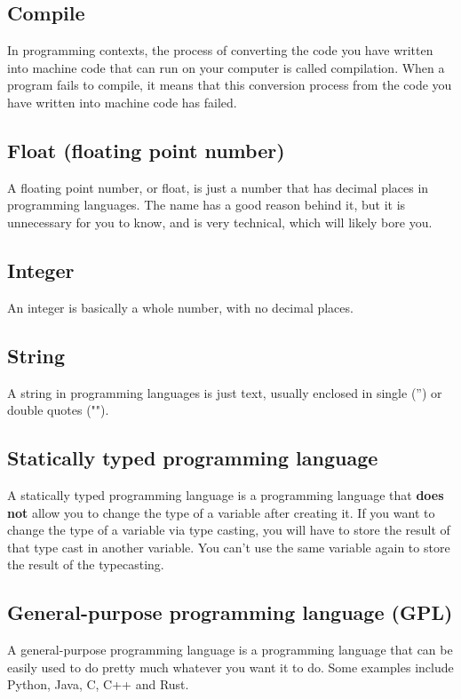 \documentclass[11pt]{article}
\begin{document}
\subsection{Compile}
\label{sec:orgd2a7353}
In programming contexts, the process of
converting the code you have written into
machine code that can run on your computer
is called compilation. When a program fails
to compile, it means that this conversion
process from the code you have written
into machine code has failed.

\subsection{Float (floating point number)}
\label{sec:org05a1ad0}
A floating point number, or float,
is just a number that has decimal places
in programming languages.
The name has a good reason behind it, but
it is unnecessary for you to know, and
is very technical, which will likely bore you.

\subsection{Integer}
\label{sec:org5517943}
An integer is basically a whole number,
with no decimal places.

\subsection{String}
\label{sec:orgf4370b9}
A string in programming languages is just text,
usually enclosed in single ('') or double
quotes ("").

\subsection{Statically typed programming language}
\label{sec:org0af6b10}
A statically typed programming language
is a programming language that \textbf{does not}
allow you to change the type of a variable
after creating it. If you want to change
the type of a variable via type casting,
you will have to store the result of that
type cast in another variable. You can't
use the same variable again to store
the result of the typecasting.

\subsection{General-purpose programming language (GPL)}
\label{sec:org42c1d6a}
A general-purpose programming language is
a programming language that can be easily used
to do pretty much whatever you want it to do.
Some examples include Python, Java, C, C++ and Rust.
\end{document}
